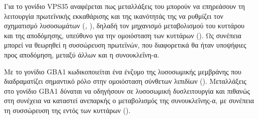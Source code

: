 \documentclass[12pt]{report}
\begin{document}
        \par
        Για το γονίδιο VPS35 αναφέρεται πως μεταλλάξεις του μπορούν να επηρεάσουν τη λειτουργία πρωτεϊνικής εκκαθάρισης και της ικανότητάς της να ρυθμίζει τον σχηματισμό λυσοσωμάτων (\emph{\cite{Trevisan2024GeneticsPerspectives}, \cite{Sassone2021TheDisease}}), δηλαδή τον μηχανισμό μεταβολισμού του κυττάρου και της αποδόμησης, υπεύθυνο για την ομοιόσταση των κυττάρων (\emph{\cite{Yang2021LysosomeFunctions}}). Ως συνέπεια μπορεί να θεωρηθεί η συσσώρευση πρωτεϊνών, που διαφορετικά θα ήταν υποψήφιες προς αποδόμηση, μεταξύ άλλων και η συνουκλεΐνη-α. 
        \par
        Με το γονίδιο GBA1 κωδικοποιείται ένα ένζυμο της λυσοσωμικής μεμβράνης που διαδραματίζει σημαντικό ρόλο στην ομοιόσταση σύνθετων λιπιδίων (\emph{\cite{Trevisan2024GeneticsPerspectives}}). Μεταλλάξεις στο γονίδιο GBA1 δύναται να οδηγήσουν σε λυσοσωμική δυσλειτουργία και πιθανώς στη συνέχεια να καταστεί ανεπαρκής ο μεταβολισμός της συνουκλεΐνης-α, με συνέπεια τη συσσώρευση της εντός των κυττάρων (\emph{\cite{Smith2022GBATreatments}}).         
        
\end{document}
